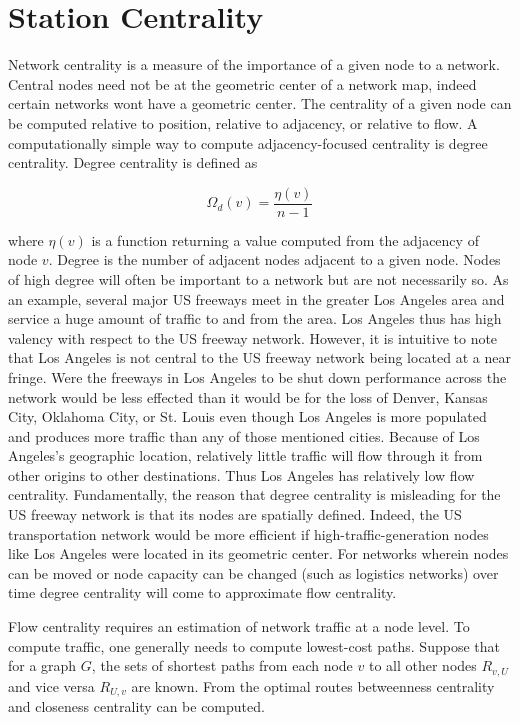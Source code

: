 \section{Station Centrality}

Network centrality is a measure of the importance of a given node to a network. Central nodes need not be at the geometric center of a network map, indeed certain networks wont have a geometric center. The centrality of a given node can be computed relative to position, relative to adjacency, or relative to flow. A computationally simple way to compute adjacency-focused centrality is degree centrality. Degree centrality is defined as

\begin{equation}
	\Omega_d(v) = \frac{\eta(v)}{n - 1}
\end{equation}

where $\eta(v)$ is a function returning a value computed from the adjacency of node $v$. Degree is the number of adjacent nodes adjacent to a given node. Nodes of high degree will often be important to a network but are not necessarily so. As an example, several major US freeways meet in the greater Los Angeles area and service a huge amount of traffic to and from the area. Los Angeles thus has high valency with respect to the US freeway network. However, it is intuitive to note that Los Angeles is not central to the US freeway network being located at a near fringe. Were the freeways in Los Angeles to be shut down performance across the network would be less effected than it would be for the loss of Denver, Kansas City, Oklahoma City, or St. Louis even though Los Angeles is more populated and produces more traffic than any of those mentioned cities. Because of Los Angeles's geographic location, relatively little traffic will flow through it from other origins to other destinations. Thus Los Angeles has relatively low flow centrality. Fundamentally, the reason that degree centrality is misleading for the US freeway network is that its nodes are spatially defined. Indeed, the US transportation network would be more efficient if high-traffic-generation nodes like Los Angeles were located in its geometric center. For networks wherein nodes can be moved or node capacity can be changed (such as logistics networks) over time degree centrality will come to approximate flow centrality.

Flow centrality requires an estimation of network traffic at a node level. To compute traffic, one generally needs to compute lowest-cost paths. Suppose that for a graph $G$, the sets of shortest paths from each node $v$ to all other nodes $R_{v,U}$ and vice versa $R_{U,v}$ are known. From the optimal routes betweenness centrality and closeness centrality can be computed.

